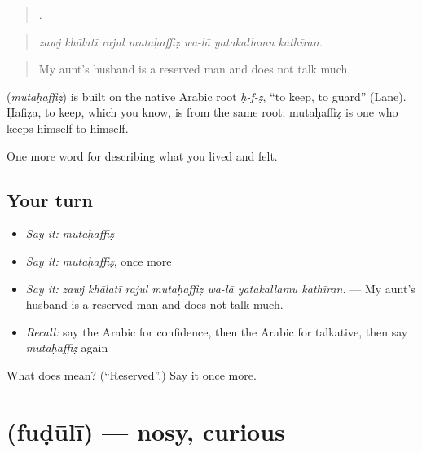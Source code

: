 \begin{quote}
      .
\end{quote}

\begin{quote}
\emph{zawj khālatī rajul mutaḥaffiẓ wa-lā yatakallamu kathīran.}
\end{quote}

\begin{quote}
My aunt's husband is a reserved man and does not talk much.
\end{quote}

\begin{cousinweb}
\textbf{} (\emph{mutaḥaffiẓ}) is built on the native Arabic root \emph{ḥ-f-ẓ}, \textquotedblleft{}to keep, to guard\textquotedblright{} (Lane). Ḥafiẓa, to keep, which you know, is from the same root; mutaḥaffiẓ is one who keeps himself to himself.
\end{cousinweb}

\begin{grammarlens}[title={What you've built}]
One more word for describing what you lived and felt.
\end{grammarlens}

\subsection*{Your turn}
\begin{itemize}
\raggedright
  \item \emph{Say it:} \emph{mutaḥaffiẓ}
  \item \emph{Say it:} \emph{mutaḥaffiẓ}, once more
  \item \emph{Say it:} \emph{zawj khālatī rajul mutaḥaffiẓ wa-lā yatakallamu kathīran.} — My aunt's husband is a reserved man and does not talk much.
  \item \emph{Recall:} say the Arabic for confidence, then the Arabic for talkative, then say \emph{mutaḥaffiẓ} again
\end{itemize}

\begin{tcolorbox}[breakable,colback=teal!4,colframe=teal!35!black,title={Before you move on}]
What does  mean? (\textquotedblleft{}Reserved\textquotedblright{}.) Say it once more.
\end{tcolorbox}
\section[\texorpdfstring{\ar{فضولي} (fuḍūlī)}{فضولي (fuḍūlī)}]{ (fuḍūlī) — nosy, curious}

